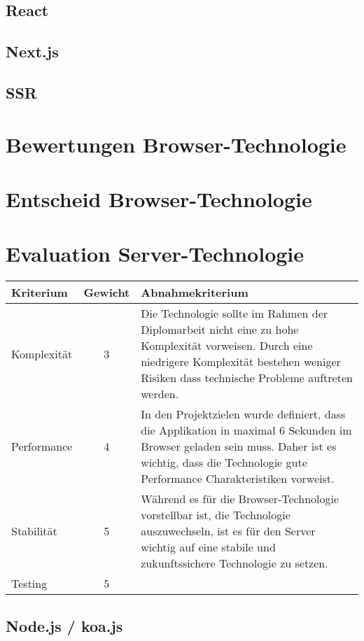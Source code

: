 \subsection{React}
\subsection{Next.js}
\subsection{SSR}

\section{Bewertungen Browser-Technologie}\label{bewertungen-browser-technologie}

\section{Entscheid Browser-Technologie}\label{entscheid-browser-technologie}

\clearpage
\section{Evaluation Server-Technologie}\label{evaluation-server-technologie}

\begin{longtable}[]{@{}p{2cm}cp{10cm}@{}}
  \toprule
  \textbf{Kriterium} & \textbf{Gewicht} & \textbf{Abnahmekriterium}\tabularnewline
  \midrule
  \endhead
  Komplexität        & 3                & Die Technologie sollte im Rahmen der Diplomarbeit nicht eine zu hohe Komplexität vorweisen. Durch eine niedrigere Komplexität bestehen weniger Risiken dass technische Probleme auftreten werden.\tabularnewline
  \midrule
  Performance        & 4                & In den Projektzielen wurde definiert, dass die Applikation in maximal 6 Sekunden im Browser geladen sein muss. Daher ist es wichtig, dass die Technologie gute Performance Charakteristiken vorweist.\tabularnewline
  \midrule
  Stabilität         & 5                & Während es für die Browser-Technologie vorstellbar ist, die Technologie auszuwechseln, ist es für den Server wichtig auf eine stabile und zukunftssichere Technologie zu setzen.\tabularnewline
  \midrule
  Testing            & 5                & \tabularnewline
  \bottomrule
\end{longtable}

\subsection{Node.js / koa.js}
